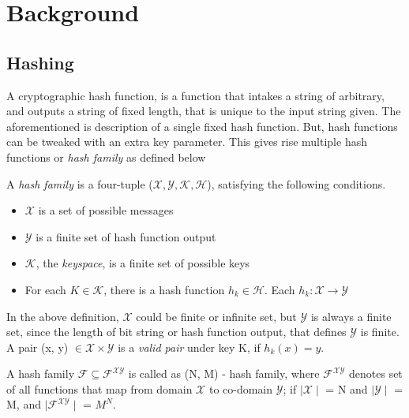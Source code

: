 \chapter{Background}

\section{Hashing}
A cryptographic hash function, is a function that intakes a string of arbitrary, and outputs a string of 
fixed length, that is unique to the input string given. The 
aforementioned is description of a single fixed hash function. But, hash functions can be tweaked
with an extra key parameter. This gives rise multiple hash functions or \emph{hash family} as 
defined below \cite{00005}

\begin{center}
  \framebox
  {
    \parbox{420pt}
    {
      A \emph{hash family} is a four-tuple ($\mathcal{X}, \mathcal{Y}, \mathcal{K}, \mathcal{H}$),
      satisfying the following conditions.
      \begin{itemize}
        \item $\mathcal{X}$ is a set of possible messages
        \item $\mathcal{Y}$ is a finite set of hash function output
        \item $\mathcal{K}$, the \emph{keyspace}, is a finite set of possible keys
        \item For each $K \in \mathcal{K}$, there is a hash function $h_{k} \in \mathcal{H}$. Each 
          $h_{k}: \mathcal{X} \to \mathcal{Y}$ 
      \end{itemize}
    }
  }
\end{center}
\vspace{4mm}

In the above definition, $\mathcal{X}$ could be finite or infinite set, but $\mathcal{Y}$ is always
a finite set, since the length of bit string or hash function output, that defines $\mathcal{Y}$ is
finite. A pair (x, y) $\in \mathcal{X} \times \mathcal{Y}$ is a \emph{valid pair} under key K, if 
$h_{k}(x) = y$.

A hash family $\mathcal{F} \subseteq \mathcal{F}^{\mathcal{XY}}$ is called as (N, M) - hash family, where
$\mathcal{F}^{\mathcal{X}\mathcal{Y}}$ denotes set of all functions that map from domain $\mathcal{X}$
to co-domain $\mathcal{Y}$; if $\mid\mathcal{X}\mid$ = N and $\mid\mathcal{Y}\mid$ = M, and 
$\mid\mathcal{F}^{\mathcal{XY}}\mid$ = $M^{N}$.

